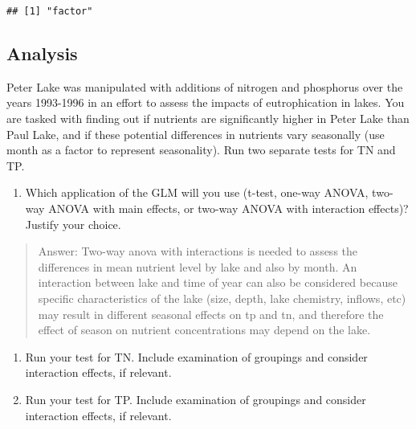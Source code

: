 \documentclass[
]{article}
\newenvironment{Shaded}{\begin{snugshade}}{\end{snugshade}}
\newcommand{\CommentTok}[1]{\textcolor[rgb]{0.56,0.35,0.01}{\textit{#1}}}
\newcommand{\DataTypeTok}[1]{\textcolor[rgb]{0.13,0.29,0.53}{#1}}
\newcommand{\KeywordTok}[1]{\textcolor[rgb]{0.13,0.29,0.53}{\textbf{#1}}}
\newcommand{\NormalTok}[1]{#1}
\newcommand{\OperatorTok}[1]{\textcolor[rgb]{0.81,0.36,0.00}{\textbf{#1}}}
\newcommand{\StringTok}[1]{\textcolor[rgb]{0.31,0.60,0.02}{#1}}
\providecommand{\tightlist}{%
  \setlength{\itemsep}{0pt}\setlength{\parskip}{0pt}}
\begin{document}
\begin{verbatim}
## [1] "factor"
\end{verbatim}

\hypertarget{analysis}{%
\subsection{Analysis}\label{analysis}}

Peter Lake was manipulated with additions of nitrogen and phosphorus
over the years 1993-1996 in an effort to assess the impacts of
eutrophication in lakes. You are tasked with finding out if nutrients
are significantly higher in Peter Lake than Paul Lake, and if these
potential differences in nutrients vary seasonally (use month as a
factor to represent seasonality). Run two separate tests for TN and TP.

\begin{enumerate}
\def\labelenumi{\arabic{enumi}.}
\setcounter{enumi}{3}
\tightlist
\item
  Which application of the GLM will you use (t-test, one-way ANOVA,
  two-way ANOVA with main effects, or two-way ANOVA with interaction
  effects)? Justify your choice.
\end{enumerate}

\begin{quote}
Answer: Two-way anova with interactions is needed to assess the
differences in mean nutrient level by lake and also by month. An
interaction between lake and time of year can also be considered because
specific characteristics of the lake (size, depth, lake chemistry,
inflows, etc) may result in different seasonal effects on tp and tn, and
therefore the effect of season on nutrient concentrations may depend on
the lake.
\end{quote}

\begin{enumerate}
\def\labelenumi{\arabic{enumi}.}
\setcounter{enumi}{4}
\item
  Run your test for TN. Include examination of groupings and consider
  interaction effects, if relevant.
\item
  Run your test for TP. Include examination of groupings and consider
  interaction effects, if relevant.
\end{enumerate}

\begin{Shaded}
\end{Shaded}
\end{document}
